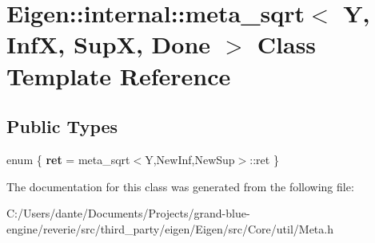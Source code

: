 \hypertarget{class_eigen_1_1internal_1_1meta__sqrt}{}\section{Eigen\+::internal\+::meta\+\_\+sqrt$<$ Y, InfX, SupX, Done $>$ Class Template Reference}
\label{class_eigen_1_1internal_1_1meta__sqrt}
\subsection*{Public Types}
\begin{DoxyCompactItemize}
\item 
\mbox{\label{class_eigen_1_1internal_1_1meta__sqrt_a6e4226656d4eba5da6a9856ee35476f4}} 
enum \{ {\bfseries ret} = meta\+\_\+sqrt$<$Y,New\+Inf,New\+Sup$>$\+::ret
 \}
\end{DoxyCompactItemize}


The documentation for this class was generated from the following file\+:\begin{DoxyCompactItemize}
\item 
C\+:/\+Users/dante/\+Documents/\+Projects/grand-\/blue-\/engine/reverie/src/third\+\_\+party/eigen/\+Eigen/src/\+Core/util/Meta.\+h\end{DoxyCompactItemize}
